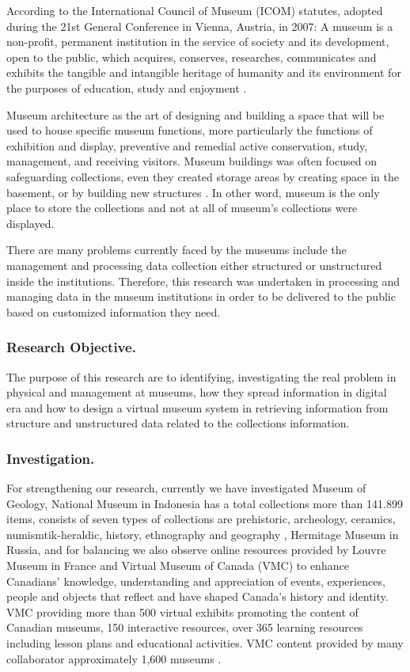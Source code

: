 According to the International Council of Museum (ICOM) statutes, adopted during the 21st General Conference in Vienna, Austria, in 2007: A museum is a non-profit, permanent institution in the service of society and its development, open to the public, which acquires, conserves, researches, communicates and exhibits the tangible and intangible heritage of humanity and its environment for the purposes of education, study and enjoyment \cite{DesvaleesMairesse}.

Museum architecture as the art of designing and building a space that will be used to house specific museum functions, more particularly the functions of exhibition and display, preventive and remedial active conservation, study, management, and receiving visitors. Museum buildings was often focused on safeguarding collections, even they created storage areas by creating space in the basement, or by building new structures \cite{MunandarPerdanaRahayu}. In other word, museum is the only place to store the collections and not at all of museum’s collections were displayed.

There are many problems currently faced by the museums include the management and processing data collection either structured or unstructured inside the institutions. Therefore, this research was undertaken in processing and managing data in the museum institutions in order to be delivered to the public based on customized information they need.

\subsubsection{Research Objective.} The purpose of this research are to identifying, investigating the real problem in physical and management at museums, how they spread information in digital era and how to design a virtual museum system in retrieving information from structure and unstructured data related to the collections information.

\subsubsection{Investigation.} 
For strengthening our research, currently we have investigated Museum of Geology, National Museum in Indonesia has a total collections more than 141.899 items, consists of seven types of collections are prehistoric, archeology, ceramics, numismtik-heraldic, history, ethnography and geography \cite{IndonesiaMuseum}, Hermitage Museum in Russia, and for balancing we also observe online resources provided by Louvre Museum in France and Virtual Museum of Canada (VMC) to enhance Canadians’ knowledge, understanding and appreciation of events, experiences, people and objects that reflect and have shaped Canada’s history and identity. VMC providing more than 500 virtual exhibits promoting the content of Canadian museums, 150 interactive resources, over 365 learning resources including lesson plans and educational activities. VMC content provided by many collaborator approximately 1,600 museums \cite{CanadaMuseum}.

